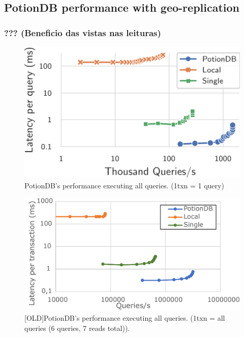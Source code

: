 \documentclass[sigplan,10pt]{acmart}
\begin{document}
\subsection{PotionDB performance with geo-replication}

\subsubsection{??? (Beneficio das vistas nas leituras)}

\begin{figure}[h]
	\centering
	\includegraphics{singleQuery/all_queries_tc}
	\caption{PotionDB's performance executing all queries. (1txn = 1 query)}
	\label{fig:(new)global_local_single_tc}
\end{figure}

\begin{figure}[h]
	\centering
	\includegraphics[width=1\linewidth]{clientScale_tc_cut}
	\caption{[OLD]PotionDB's performance executing all queries. (1txn = all queries (6 queries, 7 reads total)).}
	\label{fig:(new)global_local_single_tc}
\end{figure}
\end{document}
